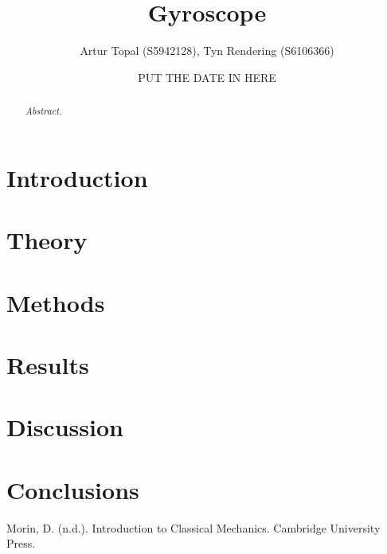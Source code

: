\documentclass[a4paper,12pt]{article}
\title{Gyroscope}
\author{Artur Topal (S5942128), Tyn Rendering (S6106366)}
\date{PUT THE DATE IN HERE}
\begin{document}
\begin{titlingpage}
  \centering
  \maketitle
  \vspace{2cm}
  \begin{abstract}
  \textit{Abstract.}
\end{abstract}

\end{titlingpage}

\break
\tableofcontents
\break
\section{Introduction} \label{sec:introduction}


\section{Theory} \label{sec:theory}


\section{Methods} \label{sec:methods}


\section{Results} \label{sec:results}


\section{Discussion} \label{sec:discussion}


\section{Conclusions} \label{sec:conclusions}



\begin{thebibliography}{99}

Morin, D. (n.d.). Introduction to Classical Mechanics. Cambridge University Press.
  
\end{thebibliography}
\end{document}
